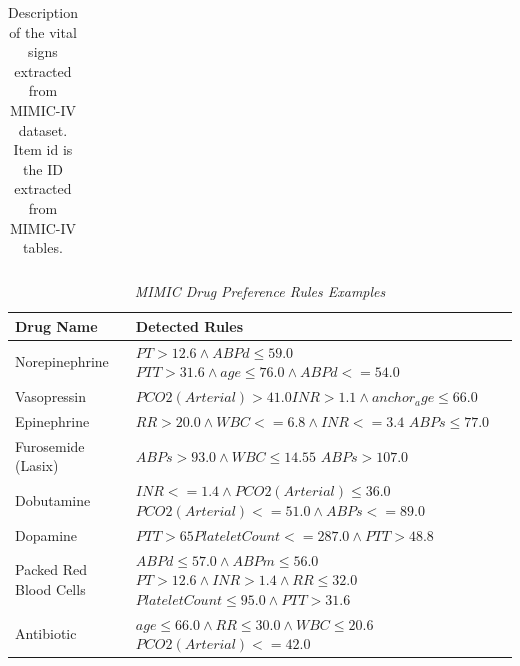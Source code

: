 \documentclass{article} %
\begin{document}
\begin{table}[h!]
\begin{tabular}{l|l|l|l}
\end{tabular}
\caption{Description of the vital signs extracted from MIMIC-IV dataset. Item id is the ID extracted from MIMIC-IV tables.}
\label{appendix:tab_mimic_iv_vital}
\end{table}
\begin{table}[h!]
    \centering
    \begin{tabular}{p{4cm}|p{8cm}}
    \toprule
        Drug Name & Detected Rules\\
        \hline
        \hline
        Norepinephrine& $PT > 12.6 \wedge ABPd \leq 59.0$ \newline $PTT > 31.6 \wedge age \leq 76.0 \wedge ABPd <= 54.0$ \\
        \hline
        Vasopressin   & $PCO2 (Arterial) > 41.0$\newline  $INR > 1.1 \wedge anchor_age \leq 66.0$\\
        \hline
        Epinephrine & $RR > 20.0 \wedge WBC <= 6.8 \wedge INR <= 3.4$ \newline $ABPs \leq 77.0$ \\
        \hline
        Furosemide (Lasix) & $ABPs > 93.0 \wedge WBC \leq 14.55$ \newline $ABPs > 107.0$ \\
        \hline
        Dobutamine & $INR <= 1.4 \wedge PCO2 (Arterial) \leq 36.0$ \newline $PCO2 (Arterial) <= 51.0 \wedge ABPs <= 89.0$ \\
        \hline
        Dopamine &$PTT > 65$\newline $Platelet Count <= 287.0 \wedge PTT > 48.8$\\
        \hline
        Packed Red Blood Cells & $ABPd \leq 57.0 \wedge ABPm \leq 56.0$\newline $PT > 12.6 \wedge INR > 1.4 \wedge RR \leq 32.0$\newline$Platelet Count \leq 95.0 \wedge PTT > 31.6$ \\
        \hline
        Antibiotic  & $age \leq 66.0 \wedge RR \leq 30.0 \wedge WBC \leq 20.6$ \newline $PCO2 (Arterial) <= 42.0$\\
    \bottomrule
    \end{tabular}
    \caption{\textit{MIMIC Drug Preference Rules Examples}}
    \label{tab:MIMIC Drug Preference Rules Examples}
\end{table}
%

%
%
%
%
%
%
%
%
%
%
%
%
%
\end{document}
